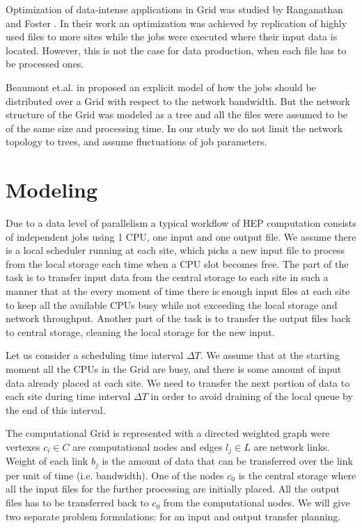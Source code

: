 Optimization of data-intense applications in Grid was studied by Ranganathan and Foster \cite{Globus_scheduler}. In their work an optimization was achieved by replication of highly used files to more sites while the jobs were executed where their input data is located. However, this is not the case for data production, when each file has to be processed ones. 

Beaumont et.al. in \cite{Trees} proposed an explicit model of how the jobs should be distributed over a Grid with respect to the network bandwidth. But the network structure of the Grid was modeled as a tree and all the files were assumed to be of the same size and processing time. In our study we do not limit the network topology to trees, and assume fluctuations of job parameters. 

\section{Modeling}
\label{modeling}
Due to a data level of parallelism a typical workflow of HEP computation consists of independent jobs using 1 CPU, one input and one output file. We assume there is a local scheduler running at each site, which picks a new input file to process from the local storage each time when a CPU slot becomes free. The part of the task is to transfer input data from the central storage to each site in such a manner that at the every moment of time there is enough input files at each site to keep all the available CPUs busy while not exceeding the local storage and network throughput. Another part of the task is to transfer the output files back to central storage, cleaning the local storage for the new input.

Let us consider a scheduling time interval $\Delta T$. We assume that at the starting moment all the CPUs in the Grid are busy, and there is some amount of input data already placed at each site. We need to transfer the next portion of data to each site during time interval $\Delta T$ in order to avoid draining of the local queue by the end of this interval. 

The computational Grid is represented with a directed weighted graph were vertexes $c_{i} \in C$ are computational nodes and edges $l_{j} \in L$ are network links. Weight of each link $b_{j}$ is the amount of data that can be transferred over the link per unit of time (i.e. bandwidth). One of the nodes $c_{0}$ is the central storage where all the input files for the further processing are initially placed. All the output files has to be transferred back to $c_{0}$ from the computational nodes. We will give two separate problem formulations: for an input and output transfer planning. 

